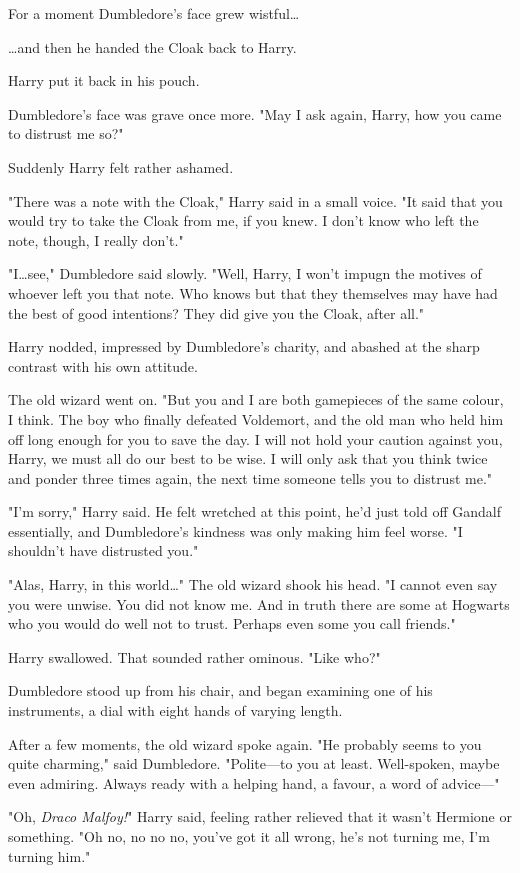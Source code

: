 For a moment Dumbledore’s face grew wistful…

…and then he handed the Cloak back to Harry.

Harry put it back in his pouch.

Dumbledore’s face was grave once more. "May I ask again, Harry, how you came to
distrust me so?"

Suddenly Harry felt rather ashamed.

"There was a note with the Cloak," Harry said in a small voice. "It said that
you would try to take the Cloak from me, if you knew. I don’t know who left the
note, though, I really don’t."

"I…see," Dumbledore said slowly. "Well, Harry, I won’t impugn the
motives of whoever left you that note. Who knows but that they themselves may
have had the best of good intentions? They did give you the Cloak, after all."

Harry nodded, impressed by Dumbledore’s charity, and abashed at the sharp
contrast with his own attitude.

The old wizard went on. "But you and I are both gamepieces of the same colour, I
think. The boy who finally defeated Voldemort, and the old man who held him off
long enough for you to save the day. I will not hold your caution against you,
Harry, we must all do our best to be wise. I will only ask that you think twice
and ponder three times again, the next time someone tells you to distrust me."

"I’m sorry," Harry said. He felt wretched at this point, he’d just told off
Gandalf essentially, and Dumbledore’s kindness was only making him feel worse.
"I shouldn’t have distrusted you."

"Alas, Harry, in this world…" The old wizard shook his head. "I cannot
even say you were unwise. You did not know me. And in truth there are some at
Hogwarts who you would do well not to trust. Perhaps even some you call
friends."

Harry swallowed. That sounded rather ominous. "Like who?"

Dumbledore stood up from his chair, and began examining one of his instruments,
a dial with eight hands of varying length.

After a few moments, the old wizard spoke again. "He probably seems to you
quite charming," said Dumbledore. "Polite—to you at least. Well-spoken, maybe
even admiring. Always ready with a helping hand, a favour, a word of advice—"

"Oh, \emph{Draco Malfoy!}" Harry said, feeling rather relieved that it wasn’t
Hermione or something. "Oh no, no no no, you’ve got it all wrong, he’s not
turning me, I’m turning him."

